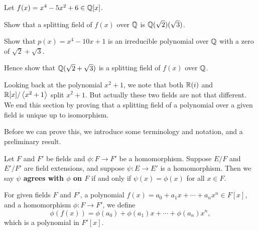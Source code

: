 \begin{exercise}\label{exercise-splitting-field-sqrt2-sqrt3}
    Let $f(x) = x^4 - 5x^2 + 6 \in \mathbb{Q}[x]$.
    \begin{partquestions}{\roman*}
        \item Show that a splitting field of $f(x)$ over $\mathbb{Q}$ is $\mathbb{Q}(\sqrt2)(\sqrt3)$.
        \item Show that $p(x) = x^4 - 10x + 1$ is an irreducible polynomial over $\mathbb{Q}$ with a zero of $\sqrt2 + \sqrt3$.
        \item Hence show that $\mathbb{Q}(\sqrt2 + \sqrt3)$ is a splitting field of $f(x)$ over $\mathbb{Q}$.
    \end{partquestions}
\end{exercise}

Looking back at the polynomial $x^2+1$, we note that both $\mathbb{R}(i)$ and $\mathbb{R}[x]/\left\langle x^2+1\right\rangle$ split $x^2+1$. But actually these two fields are not that different. We end this section by proving that a splitting field of a polynomial over a given field is unique up to isomorphism.

Before we can prove this, we introduce some terminology and notation, and a preliminary result.

\begin{definition}
    Let $F$ and $F'$ be fields and $\phi: F \to F'$ be a homomorphism. Suppose $E/F$ and $E'/F'$ are field extensions, and suppose $\psi: E \to E'$ is a homomorphism. Then we say \textbf{$\psi$ agrees with $\phi$ on $F$} if and only if $\psi(x) = \phi(x)$ for all $x \in F$.
\end{definition}

\begin{definition}
    For given fields $F$ and $F'$, a polynomial $f(x) = a_0 + a_1x + \cdots + a_nx^n \in F[x]$, and a homomorphism $\phi: F \to F'$, we define
    \[
        \phi(f(x)) = \phi(a_0) + \phi(a_1)x + \cdots + \phi(a_n)x^n,
    \]
    which is a polynomial in $F'[x]$.
\end{definition}

\newpage

